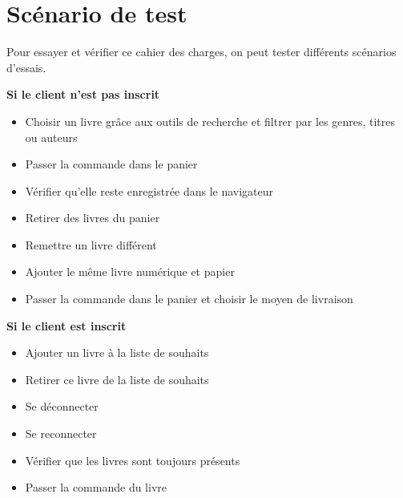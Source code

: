\documentclass[a4paper, 13pt]{article}
\begin{document}
\section{Scénario de test}
Pour essayer et vérifier ce cahier des charges, on peut tester différents scénarios d'essais.

\bigskip\noindent
\textbf{Si le client n'est pas inscrit}
\begin{itemize}
    \item Choisir un livre grâce aux outils de recherche et filtrer par les genres, titres ou auteurs
    \item Passer la commande dans le panier
    \item Vérifier qu'elle reste enregistrée dans le navigateur
    \item Retirer des livres du panier
    \item Remettre un livre différent
    \item Ajouter le même livre numérique et papier
    \item Passer la commande dans le panier et choisir le moyen de livraison
\end{itemize}
\bigskip
\textbf{Si le client est inscrit}
\begin{itemize}
    \item Ajouter un livre à la liste de souhaits
    \item Retirer ce livre de la liste de souhaits
    \item Se déconnecter
    \item Se reconnecter
    \item Vérifier que les livres sont toujours présents
    \item Passer la commande du livre
\end{itemize}
\end{document}
